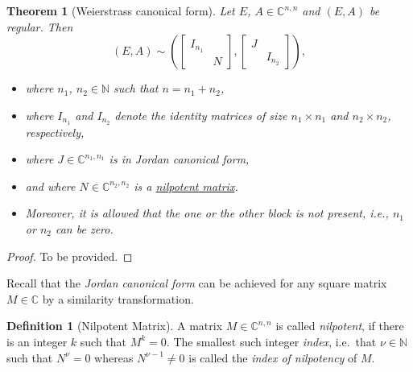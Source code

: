 \documentclass[]{book}
\providecommand{\tightlist}{%
  \setlength{\itemsep}{0pt}\setlength{\parskip}{0pt}}
\newtheorem{theorem}{Theorem}[chapter]
\theoremstyle{definition}
\newtheorem{definition}{Definition}[chapter]
\theoremstyle{definition}
\theoremstyle{definition}
\theoremstyle{definition}
\theoremstyle{remark}
\begin{document}
\begin{theorem}[Weierstrass canonical form]
\protect\hypertarget{thm:weierstrass-cf}{}{\label{thm:weierstrass-cf} {} }Let \(E\), \(A \in \mathbb C^{n,n}\) and \((E,A)\) be regular. Then
\begin{equation}
(E, A) \sim 
\left (
\begin{bmatrix}
I_{n_1} \\
& N
\end{bmatrix}
,
\begin{bmatrix}
J \\
& I_{n_2}
\end{bmatrix}
\right ),
\label{eq:weierstrass-cf}
\end{equation}

\begin{itemize}
\tightlist
\item
  where \(n_1\), \(n_2 \in \mathbb N\) such that \(n=n_1+n_2\),
\item
  where \(I_{n_1}\) and \(I_{n_2}\) denote the identity matrices of size \(n_1\times n_1\) and \(n_2\times n_2\), respectively,
\item
  where \(J\in \mathbb C^{n_1,n_1}\) is in \emph{Jordan canonical form},
\item
  and where \(N \in \mathbb C^{n_2,n_2}\) is a \protect\hyperlink{def:nilpotent-matrix}{\emph{nilpotent} matrix}.
\item
  Moreover, it is allowed that the one or the other block is not present, i.e., \(n_1\) or \(n_2\) can be zero.
\end{itemize}
\end{theorem}

\begin{proof}
{}To be provided.
\end{proof}

Recall that the \emph{Jordan canonical form} can be achieved for any square matrix \(M\in \mathbb C\) by a similarity transformation.

\begin{definition}[Nilpotent Matrix]
\protect\hypertarget{def:nilpotent-matrix}{}{\label{def:nilpotent-matrix} {} }A matrix \(M\in \mathbb C^{n,n}\) is called \emph{nilpotent}, if there is an integer \(k\) such that \(M^k=0\). The smallest such integer \emph{index}, i.e.~that \(\nu \in \mathbb N\) such that \(N^\nu=0\) whereas \(N^{\nu-1} \neq 0\) is called the \emph{index of nilpotency} of \(M\).
\end{definition}
\end{document}
